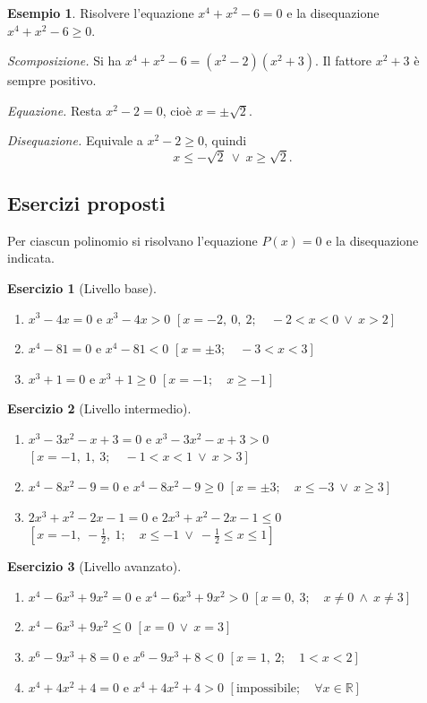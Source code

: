 \documentclass[12pt,a4paper,openany]{book}
\theoremstyle{definition}
\newtheorem{esempio}{Esempio}[section]
\newtheorem{esercizio}{Esercizio}[section]
\theoremstyle{plain}
\theoremstyle{remark}
\newcommand{\R}{\mathbb{R}}
\begin{document}
\begin{esempio}
Risolvere l'equazione $x^4+x^2-6=0$ e la disequazione $x^4+x^2-6\ge 0$.

\emph{Scomposizione.} Si ha $x^4+x^2-6=(x^2-2)(x^2+3)$. Il fattore $x^2+3$ è sempre positivo.

\emph{Equazione.} Resta $x^2-2=0$, cioè $x=\pm\sqrt{2}$.

\emph{Disequazione.} Equivale a $x^2-2\ge 0$, quindi
\[
x\le -\sqrt{2}\ \lor\ x\ge\sqrt{2}.
\]
\end{esempio}

\subsection*{Esercizi proposti}

Per ciascun polinomio si risolvano l'equazione $P(x)=0$ e la disequazione indicata.

\begin{esercizio}[Livello base]
\begin{enumerate}[label=\alph*)]
\item $x^3-4x=0$ \quad e \quad $x^3-4x>0$ \hfill $[x=-2,\ 0,\ 2;\quad -2<x<0\ \lor\ x>2]$
\item $x^4-81=0$ \quad e \quad $x^4-81<0$ \hfill $[x=\pm 3;\quad -3<x<3]$
\item $x^3+1=0$ \quad e \quad $x^3+1\ge 0$ \hfill $[x=-1;\quad x\ge -1]$
\end{enumerate}
\end{esercizio}

\begin{esercizio}[Livello intermedio]
\begin{enumerate}[label=\alph*)]
\item $x^3-3x^2-x+3=0$ \quad e \quad $x^3-3x^2-x+3>0$ \hfill $[x=-1,\ 1,\ 3;\quad -1<x<1\ \lor\ x>3]$
\item $x^4-8x^2-9=0$ \quad e \quad $x^4-8x^2-9\ge 0$ \hfill $[x=\pm 3;\quad x\le -3\ \lor\ x\ge 3]$
\item $2x^3+x^2-2x-1=0$ \quad e \quad $2x^3+x^2-2x-1\le 0$ \hfill $[x=-1,\ -\tfrac12,\ 1;\quad x\le -1\ \lor\ -\tfrac12\le x\le 1]$
\end{enumerate}
\end{esercizio}

\begin{esercizio}[Livello avanzato]
\begin{enumerate}[label=\alph*)]
\item $x^4-6x^3+9x^2=0$ \quad e \quad $x^4-6x^3+9x^2>0$ \hfill $[x=0,\ 3;\quad x\neq 0\ \land\ x\neq 3]$
\item $x^4-6x^3+9x^2\le 0$ \hfill $[x=0\ \lor\ x=3]$
\item $x^6-9x^3+8=0$ \quad e \quad $x^6-9x^3+8<0$ \hfill $[x=1,\ 2;\quad 1<x<2]$
\item $x^4+4x^2+4=0$ \quad e \quad $x^4+4x^2+4>0$ \hfill $[\text{impossibile};\quad \forall x\in\R]$
\end{enumerate}
\end{esercizio}
\end{document}
